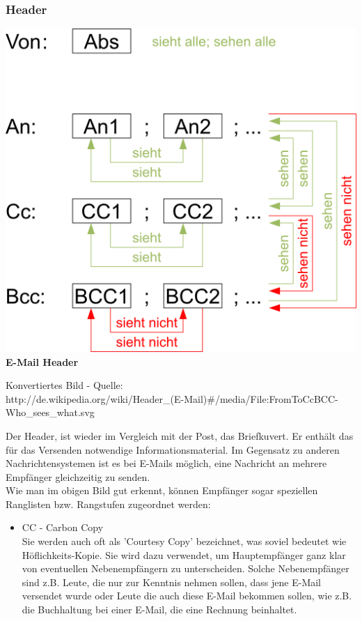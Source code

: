 \documentclass[12pt,a4paper]{report}
\begin{document}
\begin{onehalfspace}
\subsubsection{Header}
\begin{center}
\includegraphics[scale=0.9]{../docs/lyaton/graphics/E-Mail-Header.png}\\
\textbf{E-Mail Header}\\
\begin{scriptsize}
Konvertiertes Bild - Quelle:\\http://de.wikipedia.org/wiki/Header\_(E-Mail)\#/media/File:FromToCcBCC-Who\_sees\_what.svg
\end{scriptsize}
\end{center}
\vspace{0.5cm}
Der Header, ist wieder im Vergleich mit der Post, das Briefkuvert. Er enthält das für das Versenden notwendige Informationsmaterial. Im Gegensatz zu anderen Nachrichtensystemen ist es bei E-Mails möglich, eine Nachricht an mehrere Empfänger gleichzeitig zu senden.\\
Wie man im obigen Bild gut erkennt, können Empfänger sogar speziellen Ranglisten bzw. Rangstufen zugeordnet werden:
\begin{itemize}
\item CC - Carbon Copy\\
Sie werden auch oft als 'Courtesy Copy' bezeichnet, was soviel bedeutet wie Höflichkeits-Kopie. Sie wird dazu verwendet, um Hauptempfänger ganz klar von eventuellen Nebenempfängern zu unterscheiden. Solche Nebenempfänger sind z.B. Leute, die nur zur Kenntnis nehmen sollen, dass jene E-Mail versendet wurde oder Leute die auch diese E-Mail bekommen sollen, wie z.B. die Buchhaltung bei einer E-Mail, die eine Rechnung beinhaltet.

\end{itemize}
\end{onehalfspace}
\end{document}
